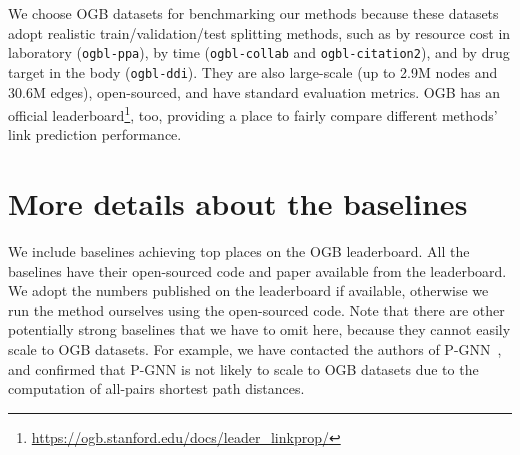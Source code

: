 \documentclass{article}
\begin{document}
\begin{table*}[h]
\caption{Statistics and evaluation metrics of OGB link prediction datasets.}
\label{ogb}
\begin{center}
\end{center}
\end{table*}

We choose OGB datasets for benchmarking our methods because these datasets adopt realistic train/validation/test splitting methods, such as by resource cost in laboratory (\texttt{ogbl-ppa}), by time (\texttt{ogbl-collab} and \texttt{ogbl-citation2}), and by drug target in the body (\texttt{ogbl-ddi}). They are also large-scale (up to 2.9M nodes and 30.6M edges), open-sourced, and have standard evaluation metrics. OGB has an official leaderboard\footnote{\url{https://ogb.stanford.edu/docs/leader\_linkprop/}}, too, providing a place to fairly compare different methods' link prediction performance.



\section{More details about the baselines} \label{detailedbaselines}

We include baselines achieving top places on the OGB leaderboard. All the baselines have their open-sourced code and paper available from the leaderboard. We adopt the numbers published on the leaderboard if available, otherwise we run the method ourselves using the open-sourced code. Note that there are other potentially strong baselines that we have to omit here, because they cannot easily scale to OGB datasets. For example, we have contacted the authors of P-GNN~\citep{you2019position}, and confirmed that P-GNN is not likely to scale to OGB datasets due to the computation of all-pairs shortest path distances.
\end{document}
